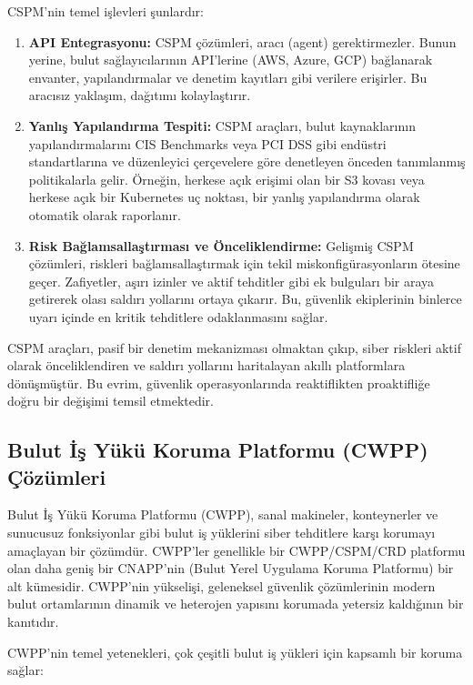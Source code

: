 CSPM'nin temel işlevleri şunlardır:

\begin{enumerate}
    \item \textbf{API Entegrasyonu:} CSPM çözümleri, aracı (agent) gerektirmezler. Bunun yerine, bulut sağlayıcılarının API'lerine (AWS, Azure, GCP) bağlanarak envanter, yapılandırmalar ve denetim kayıtları gibi verilere erişirler. Bu aracısız yaklaşım, dağıtımı kolaylaştırır.
    \item \textbf{Yanlış Yapılandırma Tespiti:} CSPM araçları, bulut kaynaklarının yapılandırmalarını CIS Benchmarks veya PCI DSS gibi endüstri standartlarına ve düzenleyici çerçevelere göre denetleyen önceden tanımlanmış politikalarla gelir. Örneğin, herkese açık erişimi olan bir S3 kovası veya herkese açık bir Kubernetes uç noktası, bir yanlış yapılandırma olarak otomatik olarak raporlanır.
    \item \textbf{Risk Bağlamsallaştırması ve Önceliklendirme:} Gelişmiş CSPM çözümleri, riskleri bağlamsallaştırmak için tekil miskonfigürasyonların ötesine geçer. Zafiyetler, aşırı izinler ve aktif tehditler gibi ek bulguları bir araya getirerek olası saldırı yollarını ortaya çıkarır. Bu, güvenlik ekiplerinin binlerce uyarı içinde en kritik tehditlere odaklanmasını sağlar.
\end{enumerate}

CSPM araçları, pasif bir denetim mekanizması olmaktan çıkıp, siber riskleri aktif olarak önceliklendiren ve saldırı yollarını haritalayan akıllı platformlara dönüşmüştür. Bu evrim, güvenlik operasyonlarında reaktiflikten proaktifliğe doğru bir değişimi temsil etmektedir.

\subsection{Bulut İş Yükü Koruma Platformu (CWPP) Çözümleri}

Bulut İş Yükü Koruma Platformu (CWPP), sanal makineler, konteynerler ve sunucusuz fonksiyonlar gibi bulut iş yüklerini siber tehditlere karşı korumayı amaçlayan bir çözümdür. CWPP'ler genellikle bir CWPP/CSPM/CRD platformu olan daha geniş bir CNAPP'nin (Bulut Yerel Uygulama Koruma Platformu) bir alt kümesidir. CWPP'nin yükselişi, geleneksel güvenlik çözümlerinin modern bulut ortamlarının dinamik ve heterojen yapısını korumada yetersiz kaldığının bir kanıtıdır.

CWPP'nin temel yetenekleri, çok çeşitli bulut iş yükleri için kapsamlı bir koruma sağlar:

